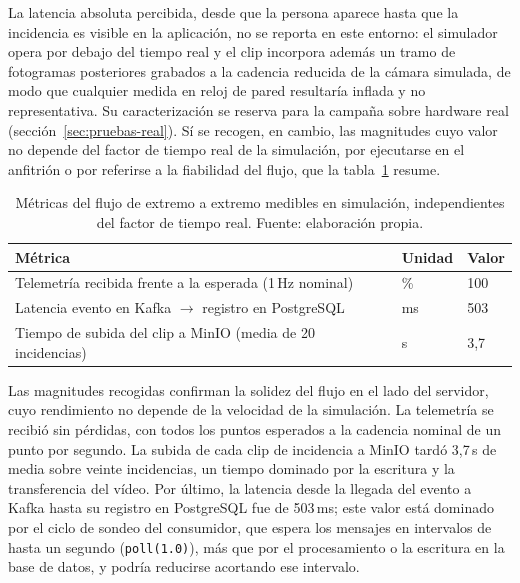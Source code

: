 La latencia absoluta percibida, desde que la persona aparece hasta que la incidencia es visible
en la aplicación, no se reporta en este entorno: el simulador opera por debajo del tiempo real y
el clip incorpora además un tramo de fotogramas posteriores grabados a la cadencia reducida de
la cámara simulada, de modo que cualquier medida en reloj de pared resultaría inflada y no
representativa. Su caracterización se reserva para la campaña sobre hardware real
(sección~\ref{sec:pruebas-real}). Sí se recogen, en cambio, las magnitudes cuyo valor no depende
del factor de tiempo real de la simulación, por ejecutarse en el anfitrión o por referirse a la
fiabilidad del flujo, que la tabla~\ref{tab:metricas-e2e} resume.

\begin{table}[htbp]
  \centering
  \small
  \caption{Métricas del flujo de extremo a extremo medibles en simulación, independientes del
  factor de tiempo real. Fuente: elaboración propia.}
  \label{tab:metricas-e2e}
  \begin{tabular}{@{}>{\raggedright\arraybackslash}p{7.5cm} l l@{}}
    \toprule
    \textbf{Métrica} & \textbf{Unidad} & \textbf{Valor} \\
    \midrule
    Telemetría recibida frente a la esperada (1\,Hz nominal)      & \% & 100 \\
    Latencia evento en Kafka $\rightarrow$ registro en PostgreSQL & ms & 503 \\
    Tiempo de subida del clip a MinIO (media de 20 incidencias)   & s  & 3,7 \\
    \bottomrule
  \end{tabular}
\end{table}

Las magnitudes recogidas confirman la solidez del flujo en el lado del servidor, cuyo rendimiento
no depende de la velocidad de la simulación. La telemetría se recibió sin pérdidas, con todos los
puntos esperados a la cadencia nominal de un punto por segundo. La subida de cada clip de
incidencia a MinIO tardó 3,7\,s de media sobre veinte incidencias, un tiempo dominado por la
escritura y la transferencia del vídeo. Por último, la latencia desde la llegada del evento a
Kafka hasta su registro en PostgreSQL fue de 503\,ms; este valor está dominado por el ciclo de
sondeo del consumidor, que espera los mensajes en intervalos de hasta un segundo
(\texttt{poll(1.0)}), más que por el procesamiento o la escritura en la base de datos, y podría
reducirse acortando ese intervalo.


